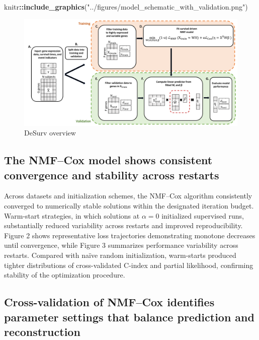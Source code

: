 \documentclass[
]{article}
\newenvironment{Shaded}{\begin{snugshade}}{\end{snugshade}}
\newcommand{\FunctionTok}[1]{\textcolor[rgb]{0.13,0.29,0.53}{\textbf{#1}}}
\newcommand{\NormalTok}[1]{#1}
\newcommand{\SpecialCharTok}[1]{\textcolor[rgb]{0.81,0.36,0.00}{\textbf{#1}}}
\newcommand{\StringTok}[1]{\textcolor[rgb]{0.31,0.60,0.02}{#1}}
\begin{document}
\begin{Shaded}
\begin{Highlighting}[]
\NormalTok{knitr}\SpecialCharTok{::}\FunctionTok{include\_graphics}\NormalTok{(}\StringTok{"../figures/model\_schematic\_with\_validation.png"}\NormalTok{)}
\end{Highlighting}
\end{Shaded}

\begin{figure}
\includegraphics[width=0.8\linewidth]{../figures/model_schematic_with_validation} \caption{DeSurv overview}\label{fig:fig-schema}
\end{figure}

\subsection{The NMF--Cox model shows consistent convergence and
stability across
restarts}\label{the-nmfcox-model-shows-consistent-convergence-and-stability-across-restarts}

Across datasets and initialization schemes, the NMF--Cox algorithm
consistently converged to numerically stable solutions within the
designated iteration budget. Warm-start strategies, in which solutions
at \(\alpha=0\) initialized supervised runs, substantially reduced
variability across restarts and improved reproducibility. Figure 2 shows
representative loss trajectories demonstrating monotone decreases until
convergence, while Figure 3 summarizes performance variability across
restarts. Compared with naïve random initialization, warm-starts
produced tighter distributions of cross-validated C-index and partial
likelihood, confirming stability of the optimization procedure.

\subsection{Cross-validation of NMF--Cox identifies parameter settings
that balance prediction and
reconstruction}\label{cross-validation-of-nmfcox-identifies-parameter-settings-that-balance-prediction-and-reconstruction}
\end{document}
